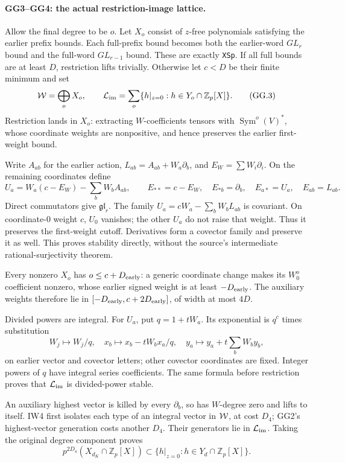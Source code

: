 \documentclass[11pt,a4paper]{article}
\numberwithin{equation}{section}
\theoremstyle{remark}\newtheorem{remark}[theorem]{Remark}
\begin{document}
\paragraph{GG3--GG4: the actual restriction-image lattice.}
Allow the final degree to be $o$. Let $X_o$ consist of $z$-free
polynomials satisfying the earlier prefix bounds. Each full-prefix
bound becomes both the earlier-word $GL_r$ bound and the full-word
$GL_{r-1}$ bound. These are exactly \texttt{XSp}.
If all full bounds are at least $D$, restriction lifts trivially.
Otherwise let $c<D$ be their finite minimum and set
\[
 {\cal W}=\bigoplus_oX_o,\qquad
 {\cal L}_{\rm im}=\sum_o
       \{h|_{z=0}:h\in Y_o\cap\mathbb Z_p[X]\}.                 \tag{GG.3}
\]
Restriction lands in $X_o$: extracting $W$-coefficients tensors
with $\operatorname{Sym}^o(V)^*$, whose coordinate weights are
nonpositive, and hence preserves the earlier first-weight bound.

Write $A_{ab}$ for the earlier action,
$L_{ab}=A_{ab}+W_a\partial_b$, and $E_W=\sum W_i\partial_i$.
On the remaining coordinates define
\[
 U_a=W_a(c-E_W)-\sum_bW_bA_{ab},\qquad
 E_{**}=c-E_W,\quad E_{*b}=\partial_b,\quad
 E_{a*}=U_a,\quad E_{ab}=L_{ab}.                               \tag{GG.4}
\]
Direct commutators give $\mathfrak{gl}_r$.
The family $U_a=cW_a-\sum_bW_bL_{ab}$ is covariant.
On coordinate-$0$ weight $c$, $U_0$ vanishes; the other $U_a$
do not raise that weight. Thus it preserves the first-weight cutoff.
Derivatives form a covector family and preserve it as well.
This proves stability directly, without the source's intermediate
rational-surjectivity theorem.

Every nonzero $X_o$ has $o\le c+D_{\rm early}$: a generic coordinate
change makes its $W_0^o$ coefficient nonzero, whose earlier signed
weight is at least $-D_{\rm early}$. The auxiliary weights therefore
lie in $[-D_{\rm early},c+2D_{\rm early}]$, of width at most $4D$.

Divided powers are integral. For $U_a$, put $q=1+tW_a$.
Its exponential is $q^c$ times substitution
\[
 W_j\mapsto W_j/q,\quad
 x_b\mapsto x_b-tW_bx_a/q,\quad
 y_a\mapsto y_a+t\sum_bW_by_b,                                 \tag{GG.5}
\]
on earlier vector and covector letters; other covector coordinates
are fixed. Integer powers of $q$ have integral series coefficients.
The same formula before restriction proves that $ {\cal L}_{\rm im}$
is divided-power stable.

An auxiliary highest vector is killed by every $\partial_b$, so has
$W$-degree zero and lifts to itself. IW4 first isolates each type of
an integral vector in $ {\cal W}$, at cost $D_4$; GG2's highest-vector
generation costs another $D_4$. Their generators lie in
$ {\cal L}_{\rm im}$. Taking the original degree component proves
\[
 p^{2D_4}(X_{d_K}\cap\mathbb Z_p[X])
       \subset\{h|_{z=0}:h\in Y_d\cap\mathbb Z_p[X]\}.           \tag{GG.6}
\]
\end{document}
